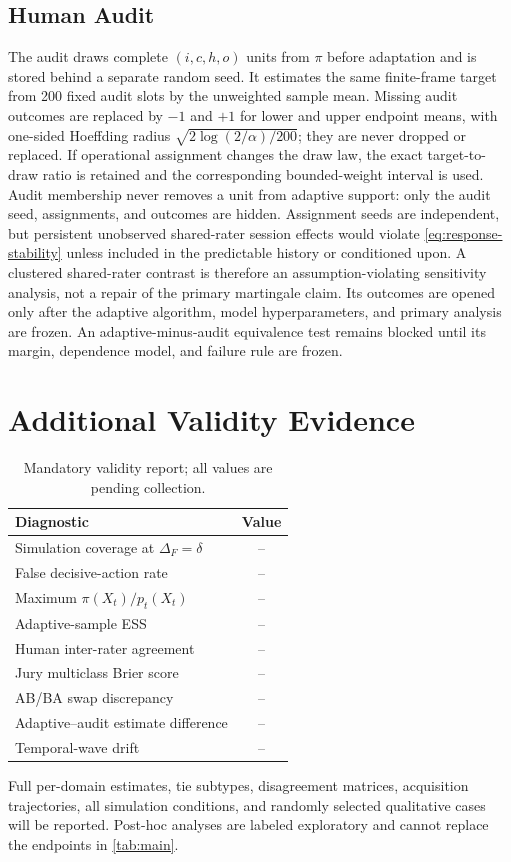 \documentclass{article}
\begin{document}
\subsection{Human Audit}
The audit draws complete $(i,c,h,o)$ units from $\pi$ before adaptation and is
stored behind a separate random seed. It estimates the same finite-frame target
from 200 fixed audit slots by the unweighted sample mean. Missing audit outcomes
are replaced by $-1$ and $+1$ for lower and upper endpoint means, with
one-sided Hoeffding radius
$\sqrt{2\log(2/\alpha)/200}$; they are never dropped or replaced. If
operational assignment changes the draw law, the exact target-to-draw ratio is
retained and the corresponding bounded-weight interval is used.
Audit membership never removes a unit from adaptive support: only the audit
seed, assignments, and outcomes are hidden. Assignment seeds are independent,
but persistent unobserved shared-rater session effects would violate
\cref{eq:response-stability} unless included in the predictable history or
conditioned upon. A clustered shared-rater contrast is therefore an
assumption-violating sensitivity analysis, not a repair of the primary
martingale claim.
Its outcomes are opened only after the adaptive algorithm, model
hyperparameters, and primary analysis are frozen. An adaptive-minus-audit
equivalence test remains blocked until its margin, dependence model, and
failure rule are frozen.

\section{Additional Validity Evidence}
\label{app:additional}

\begin{table}[h]
\caption{Mandatory validity report; all values are pending collection.}
\centering
\begin{tabular}{lc}
\toprule
Diagnostic & Value \\
\midrule
Simulation coverage at $\Delta_F=\delta$ & -- \\
False decisive-action rate & -- \\
Maximum $\pi(X_t)/p_t(X_t)$ & -- \\
Adaptive-sample ESS & -- \\
Human inter-rater agreement & -- \\
Jury multiclass Brier score & -- \\
AB/BA swap discrepancy & -- \\
Adaptive--audit estimate difference & -- \\
Temporal-wave drift & -- \\
\bottomrule
\end{tabular}
\end{table}

Full per-domain estimates, tie subtypes, disagreement matrices, acquisition
trajectories, all simulation conditions, and randomly selected qualitative
cases will be reported. Post-hoc analyses are labeled exploratory and cannot
replace the endpoints in \cref{tab:main}.
\end{document}
